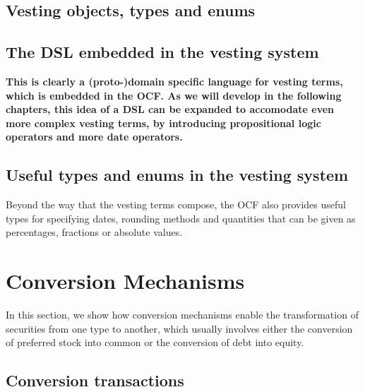 \noindent{}
\subsection{Vesting objects, types and enums}

\noindent{}

\subsection{The DSL embedded in the vesting system}

\noindent{}


\textbf{This is clearly a (proto-)domain specific language for vesting terms, which is embedded in the OCF. As we will develop in the following chapters, this idea of a DSL can be expanded to accomodate even more complex vesting terms, by introducing propositional logic operators and more date operators.}


\subsection{Useful types and enums in the vesting system}

Beyond the way that the vesting terms compose, the OCF also provides useful types for specifying dates, rounding methods and quantities that can be given as percentages, fractions or absolute values.


\section{Conversion Mechanisms}

In this section, we show how conversion mechanisms enable the transformation of securities from one type to another, which usually involves either the conversion of preferred stock into common or the conversion of debt into equity.

\subsection{Conversion transactions}

